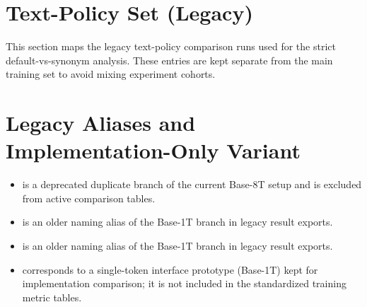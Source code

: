 \section{Text-Policy Set (Legacy)}
This section maps the legacy text-policy comparison runs used for the strict default-vs-synonym analysis.
These entries are kept separate from the main training set to avoid mixing experiment cohorts.
\begin{table}[htbp]
    \centering
    \small
    \caption{Display-name mapping for the legacy text-policy runs (\texttt{results}).}
    \label{tab:appendix_variant_mapping_text}
\end{table}

\section{Legacy Aliases and Implementation-Only Variant}
\begin{itemize}
    \item {} is a deprecated duplicate branch of the current Base-8T setup and is excluded from active comparison tables.
    \item {} is an older naming alias of the Base-1T branch in legacy result exports.
    \item {} is an older naming alias of the Base-1T branch in legacy result exports.
    \item {} corresponds to a single-token interface prototype (Base-1T) kept for implementation comparison; it is not included in the standardized training metric tables.
\end{itemize}

